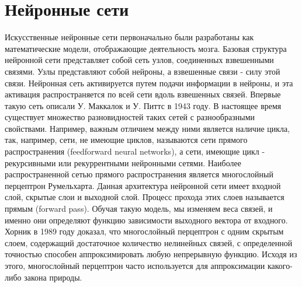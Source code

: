 \section{Нейронные сети}\label{ner_network}
    Искусственные нейронные сети первоначально были разработаны как математические модели, отображающие деятельность мозга. Базовая структура нейронной сети представляет собой сеть узлов, соединенных взвешенными связями. Узлы представляют собой нейроны, а взвешенные связи - силу этой связи. Нейронная сеть активируется путем подачи информации в нейроны, и эта активация распространяется по всей сети вдоль взвешенных связей. Впервые такую сеть описали У. Маккалок и У. Питтс в 1943 году. В настоящее время существует множество разновидностей таких сетей с разнообразными свойствами. Например, важным отличием между ними является наличие цикла, так, например, сети, не имеющие циклов, называются сети прямого распространения (feedforward neural networks), а сети, имеющие цикл - рекурсивными или рекуррентными нейронными сетями. Наиболее распространенной сетью прямого распространения является многослойный перцептрон Румельхарта. Данная архитектура нейронной сети имеет входной слой, скрытые слои и выходной слой. Процесс прохода этих слоев называется прямым (forward pass). Обучая такую модель, мы изменяем веса связей, и именно они определяют функцию зависимости выходного вектора от входного. Хорник в 1989 году доказал, что многослойный перцептрон с одним скрытым слоем, содержащий достаточное количество нелинейных связей, с определенной точностью способен аппроксимировать любую непрерывную функцию. Исходя из этого, многослойный перцептрон часто используется для аппроксимации какого-либо закона природы.
    
